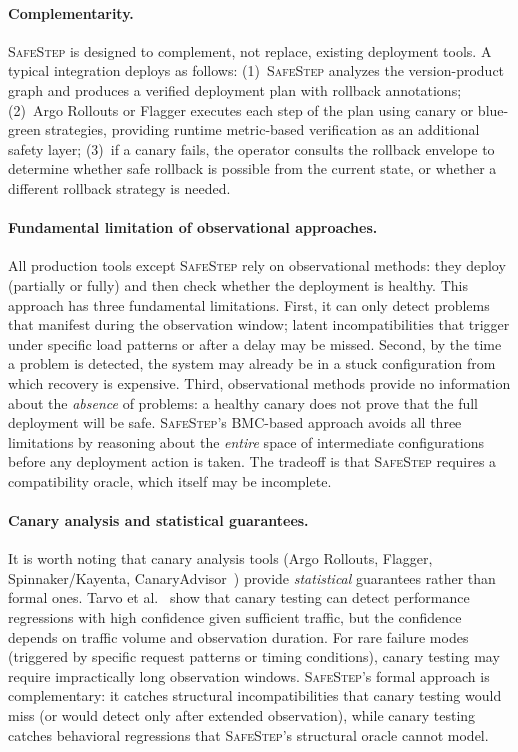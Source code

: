 \documentclass[10pt,twocolumn]{article}
\newcommand{\safestep}{\textsc{SafeStep}}
\begin{document}
\paragraph{Complementarity.}
\safestep{} is designed to complement, not replace, existing
deployment tools. A typical integration deploys as follows:
(1)~\safestep{} analyzes the version-product graph and
produces a verified deployment plan with rollback annotations;
(2)~Argo Rollouts or Flagger executes each step of the plan
using canary or blue-green strategies, providing runtime
metric-based verification as an additional safety layer;
(3)~if a canary fails, the operator consults the rollback
envelope to determine whether safe rollback is possible from
the current state, or whether a different rollback strategy
is needed.

\paragraph{Fundamental limitation of observational approaches.}
All production tools except \safestep{} rely on observational
methods: they deploy (partially or fully) and then check
whether the deployment is healthy. This approach has three
fundamental limitations. First, it can only detect problems
that manifest during the observation window; latent
incompatibilities that trigger under specific load patterns or
after a delay may be missed. Second, by the time a problem is
detected, the system may already be in a stuck configuration
from which recovery is expensive. Third, observational methods
provide no information about the \emph{absence} of problems:
a healthy canary does not prove that the full deployment will
be safe. \safestep{}'s BMC-based approach avoids all three
limitations by reasoning about the \emph{entire} space of
intermediate configurations before any deployment action is
taken. The tradeoff is that \safestep{} requires a
compatibility oracle, which itself may be incomplete.

\paragraph{Canary analysis and statistical guarantees.}
It is worth noting that canary analysis tools
(Argo Rollouts, Flagger, Spinnaker/Kayenta,
CanaryAdvisor~\cite{tarvo-canaryadvisor-2015}) provide
\emph{statistical} guarantees rather than formal ones.
Tarvo et al.~\cite{tarvo-canaryadvisor-2015} show that
canary testing can detect performance regressions with high
confidence given sufficient traffic, but the confidence
depends on traffic volume and observation duration. For
rare failure modes (triggered by specific request patterns
or timing conditions), canary testing may require
impractically long observation windows. \safestep{}'s formal
approach is complementary: it catches structural
incompatibilities that canary testing would miss (or would
detect only after extended observation), while canary testing
catches behavioral regressions that \safestep{}'s structural
oracle cannot model.
\end{document}
